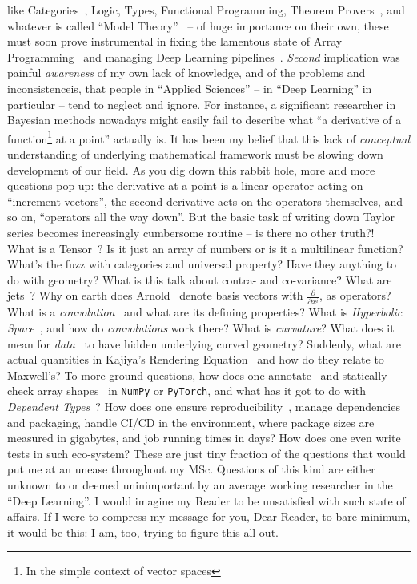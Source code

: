 like Categories~\citep{categoriesWorking}, Logic, Types, Functional
Programming, Theorem Provers~\citep{coq,lean}, and whatever is called ``Model
Theory''~\citep{marker2006model} -- of huge importance on their own, these must
soon prove instrumental in fixing the lamentous state of Array
Programming~\citep{dexlang,mcdonellGPU} and managing Deep Learning
pipelines~\citep{mokhov2018build}.  \emph{Second} implication was painful
\emph{awareness} of my own lack of knowledge, and of the problems and
inconsistenceis, that people in ``Applied Sciences'' -- in ``Deep Learning'' in
particular -- tend to neglect and ignore.  For instance, a significant
researcher in Bayesian methods nowadays might easily fail to describe what ``a
derivative of a function\footnote{In the simple context of vector spaces} at a
point'' actually is. It has been my belief that this lack of \emph{conceptual}
understanding of underlying mathematical framework must be slowing down
development of our field. As you dig down this rabbit hole, more and more
questions pop up: the derivative at a point is a linear operator acting on
``increment vectors'', the second derivative acts on the operators themselves,
and so on, ``operators all the way down''. But the basic task of writing down
Taylor series becomes increasingly cumbersome routine -- is there no other
truth?!~\citep{elliott2018simple} What is a
Tensor~\citep{bradley2020interface}? Is it just an array of numbers or is it a
multilinear function? What's the fuzz with categories and universal property?
Have they anything to do with geometry?  What is this talk about contra- and
co-variance?  What are jets~\citep{betancourt2018geometric}?  Why on earth does
Arnold~\citep{arnoldPDEs} denote basis vectors with \( \frac{\partial}{\partial
x^i} \), as operators?  What is a
\emph{convolution}~\citep{feichtingerFAHA,cohen2018general,e2cnn} and what are
its defining properties? What is \emph{Hyperbolic Space}~\citep{ganeaHNNs}, and
how do \emph{convolutions} work there? What is \emph{curvature}? What does it
mean for \emph{data}~\citep{khrulkov} to have hidden underlying curved
geometry? Suddenly, what are actual quantities in Kajiya's Rendering
Equation~\citep{kajiya1986rendering} and how do they relate to Maxwell's? To
more ground questions, how does one
annotate~\citep{documentationResearch,struturingDocumentation,doctest,doctestRust,doctestCpp}
and statically check array shapes~\citep{rush2019tensor,rush2019tensor2} in
\texttt{NumPy} or \texttt{PyTorch}, and what has it got to do with
\emph{Dependent Types}~\citep{dexlang}? How does one ensure
reproducibility~\citep{inriaSacred,catalyst,pytorchLightning,xinLiangPipelines,},
manage dependencies and packaging, handle CI/CD in the environment, where
package sizes are measured in gigabytes, and job running times in days?  How
does one even write tests in such eco-system?  These are just tiny fraction of
the questions that would put me at an unease throughout my MSc. Questions of
this kind are either unknown to or deemed uninimportant by an average working
researcher in the ``Deep Learning''. I would imagine my Reader to be
unsatisfied with such state of affairs. If I were to compress my message for
you, Dear Reader, to bare minimum, it would be this: I am, too, trying to
figure this all out.

